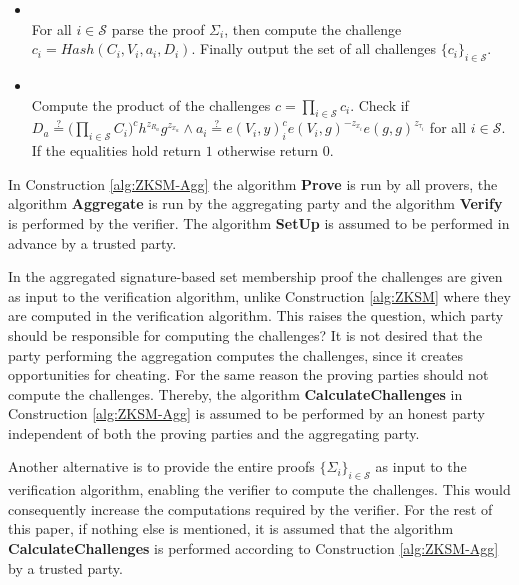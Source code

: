 \begin{algorithm}[]
\begin{itemize}
\item {}\\
For all $i\in\mathcal{S}$ parse the proof $\Sigma_i$, then compute the challenge $c_i = Hash(C_i,V_i,a_i,D_i)$. Finally output the set of all challenges $\{c_i\}_{i\in\mathcal{S}}$. 

\item{} \\
Compute the product of the challenges $c=\prod_{i\in\mathcal{S}} c_i$. Check if $D_a\overset{?}{=} \big( \prod_{i\in\mathcal{S}}C_i\big)^ch^{z_R_a}g^{z_x_a}\wedge a_i \overset{?}{=} e(V_i,y)^c_i e(V_i,g)^{-z_{x_i}}e(g,g)^{z_{\tau_i}}$ for all $i\in\mathcal{S}$. If the equalities hold return $1$ otherwise return $0$.
\end{itemize}
\label{alg:ZKSM-Agg}
\end{algorithm} 


In Construction \ref{alg:ZKSM-Agg} the algorithm \textbf{Prove} is run by all provers, the algorithm \textbf{Aggregate} is run by the aggregating party and the algorithm \textbf{Verify} is performed by the verifier. The algorithm \textbf{SetUp} is assumed to be performed in advance by a trusted party.

In the aggregated signature-based set membership proof the challenges are given as input to the verification algorithm, unlike Construction \ref{alg:ZKSM} where they are computed in the verification algorithm. This raises the question, which party should be responsible for computing the challenges?  It is not desired that the party performing the aggregation computes the challenges, since it creates opportunities for cheating. For the same reason the proving parties  should not compute the challenges. Thereby, the algorithm \textbf{CalculateChallenges} in Construction \ref{alg:ZKSM-Agg} is assumed to be performed by an honest party independent of both the proving parties and the aggregating party. 

Another alternative is to provide the entire proofs $\{\Sigma_i\}_{i\in\mathcal{S}}$ as input to the verification algorithm, enabling the verifier to compute the challenges. This would consequently increase the computations required by the verifier. For the rest of this paper, if nothing else is mentioned, it is assumed that the algorithm \textbf{CalculateChallenges} is performed according to Construction \ref{alg:ZKSM-Agg} by a trusted party. 

